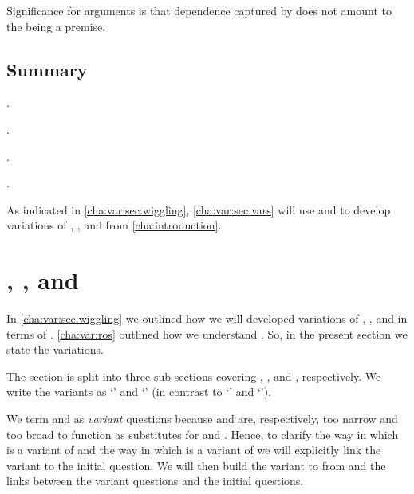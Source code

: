 \begin{note}
  Significance for arguments is that dependence captured by \qWhyVnP{} does not amount to the \ros{} being a premise.
\end{note}

\subsection{Summary}
\label{cha:var:ros:summary}

\begin{note}
  \supportI{}.

  .

  \supportII{}.

  .
\end{note}

\begin{note}
  As indicated in \autoref{cha:var:sec:wiggling}, \autoref{cha:var:sec:vars} will use  and  to develop variations of \qWhy{}, \qHow{}, and \issueInclusion{} from \autoref{cha:introduction}.
\end{note}


\section{\qWhyVnP{}, \qHowV{}, and \issueConstraint{}}
\label{cha:var:sec:vars}

\begin{note}
  In \autoref{cha:var:sec:wiggling} we outlined how we will developed variations of \qWhy{}, \qHow{}, and \issueInclusion{} in terms of \ros{}.
  \autoref{cha:var:ros} outlined how we understand .
  So, in the present section we state the variations.

  The section is split into three sub-sections covering \qWhy{}, \qHow{}, and \issueInclusion{}, respectively.
  We write the variants as `\qWhyVnP{}' and `\qHowV{}' (in contrast to `\qWhy{}' and `\qHow{}').

  We term \qWhyVnP{} and \qHowV{} as \emph{variant} questions because \qWhyVnP{} and \qHowV{} are, respectively, too narrow and too broad to function as substitutes for \qWhy{} and \qHow{}.
  Hence, to clarify the way in which \qWhyVnP{} is a variant of \qWhy{} and the way in which \qHowV{} is a variant of \qHow{} we will explicitly link the variant to the initial question.
  We will then build the variant to \issueInclusion{} from \issueInclusion{} and the links between the variant questions and the initial questions.
\end{note}

